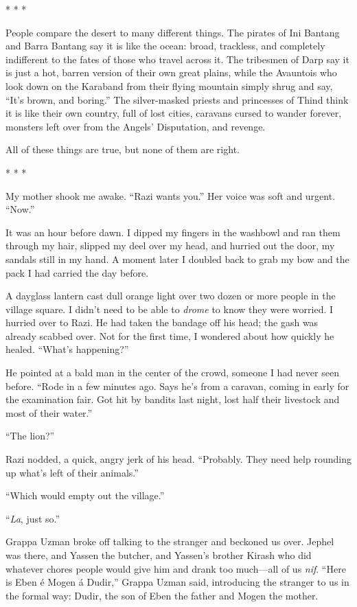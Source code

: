 \begin{center}* * *\end{center}

People compare the desert to many different things.  The pirates of
Ini Bantang and Barra Bantang say it is like the ocean: broad,
trackless, and completely indifferent to the fates of those who travel
across it.  The tribesmen of Darp say it is just a hot, barren version
of their own great plains, while the Avauntois who look down on the
Karaband from their flying mountain simply shrug and say, ``It's brown,
and boring.''  The silver-masked priests and princesses of Thind think
it is like their own country, full of lost cities, caravans cursed to
wander forever, monsters left over from the Angels' Disputation, and
revenge.

All of these things are true, but none of them are right.

\begin{center}* * *\end{center}

My mother shook me awake.  ``Razi wants you.''  Her voice was soft and
urgent.  ``Now.''

It was an hour before dawn.  I dipped my fingers in the washbowl and
ran them through my hair, slipped my deel over my head, and hurried
out the door, my sandals still in my hand.  A moment later I doubled
back to grab my bow and the pack I had carried the day before.

A dayglass lantern cast dull orange light over two dozen or more
people in the village square.  I didn't need to be able to \emph{drome} to
know they were worried.  I hurried over to Razi.  He had taken the
bandage off his head; the gash was already scabbed over.  Not for the
first time, I wondered about how quickly he healed.  ``What's
happening?''

He pointed at a bald man in the center of the crowd, someone I had
never seen before.  ``Rode in a few minutes ago.  Says he's from a
caravan, coming in early for the examination fair.  Got hit by bandits
last night, lost half their livestock and most of their water.''

``The lion?''

Razi nodded, a quick, angry jerk of his head.  ``Probably.  They need
help rounding up what's left of their animals.''

``Which would empty out the village.''

``\emph{La}, just so.''

Grappa Uzman broke off talking to the stranger and beckoned us over.
Jephel was there, and Yassen the butcher, and Yassen's brother Kirash
who did whatever chores people would give him and drank too much---all
of us \emph{nif}.  ``Here is Eben \'e Mogen \'a Dudir,'' Grappa Uzman said,
introducing the stranger to us in the formal way: Dudir, the son of
Eben the father and Mogen the mother.

